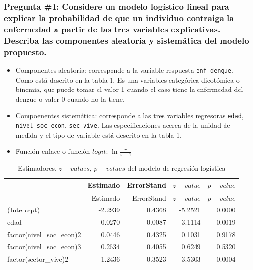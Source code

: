 \documentclass[
]{article}
\providecommand{\tightlist}{%
  \setlength{\itemsep}{0pt}\setlength{\parskip}{0pt}}
\begin{document}
\hypertarget{pregunta-1-considere-un-modelo-loguxedstico-lineal-para-explicar-la-probabilidad-de-que-un-individuo-contraiga-la-enfermedad-a-partir-de-las-tres-variables-explicativas.-describa-las-componentes-aleatoria-y-sistemuxe1tica-del-modelo-propuesto.}{%
\subsubsection{Pregunta \#1: Considere un modelo logístico lineal para
explicar la probabilidad de que un individuo contraiga la enfermedad a
partir de las tres variables explicativas. Describa las componentes
aleatoria y sistemática del modelo
propuesto.}\label{pregunta-1-considere-un-modelo-loguxedstico-lineal-para-explicar-la-probabilidad-de-que-un-individuo-contraiga-la-enfermedad-a-partir-de-las-tres-variables-explicativas.-describa-las-componentes-aleatoria-y-sistemuxe1tica-del-modelo-propuesto.}}

\begin{itemize}
\tightlist
\item
  Componentes aleatoria: corresponde a la variable respuesta
  \texttt{enf\_dengue}. Como está descrito en la tabla 1. Es una
  variables categórica dicotómica o binomia, que puede tomar el valor 1
  cuando el caso tiene la enfermedad del dengue o valor 0 cuando no la
  tiene.
\item
  Compoenentes sistemática: corresponde a las tres variables regresoras
  \texttt{edad}, \texttt{nivel\_soc\_econ}, \texttt{sec\_vive}. Las
  especificaciones acerca de la unidad de medida y el tipo de variable
  está descrito en la tabla 1.
\item
  Función enlace o función \(logit\): \(\ln \frac{\pi}{\pi - 1}\)
\end{itemize}

\begin{longtable}[]{@{}lrrrr@{}}
\caption{Estimadores, \(z-values\), \(p-values\) del modelo de regresión
logística}\tabularnewline
\toprule
& Estimado & ErrorStand & \(z-value\) & \(p-value\)\tabularnewline
\midrule
\endfirsthead
\toprule
& Estimado & ErrorStand & \(z-value\) & \(p-value\)\tabularnewline
\midrule
\endhead
(Intercept) & -2.2939 & 0.4368 & -5.2521 & 0.0000\tabularnewline
edad & 0.0270 & 0.0087 & 3.1114 & 0.0019\tabularnewline
factor(nivel\_soc\_econ)2 & 0.0446 & 0.4325 & 0.1031 &
0.9178\tabularnewline
factor(nivel\_soc\_econ)3 & 0.2534 & 0.4055 & 0.6249 &
0.5320\tabularnewline
factor(sector\_vive)2 & 1.2436 & 0.3523 & 3.5303 & 0.0004\tabularnewline
\bottomrule
\end{longtable}
\end{document}
